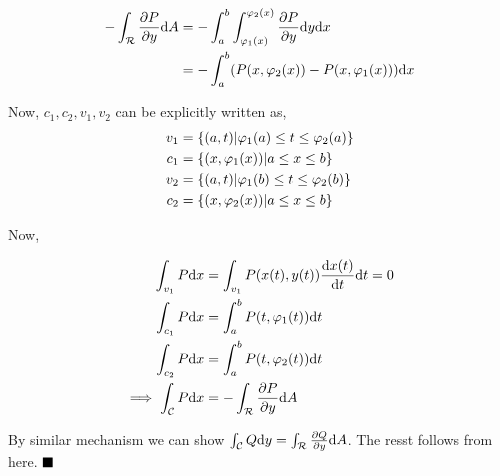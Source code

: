 \documentclass[Analysis-3]{subfiles}
\begin{document}
 \begin{align*}
    -\int_{\mathcal{R}} \pdv{P}{y} \dd A &= -\int_{a}^{b} \int_{\varphi_1(x)}^{\varphi_2(x)} \pdv{P}{y} \dd y \dd x \\
    &= - \int_{a}^{b} (P(x,\varphi_2(x))-P(x,\varphi_1(x))) \dd x \\
 \end{align*}

 Now, $c_1,c_2,v_1,v_2$ can be explicitly written as, 
 \begin{align*}
    v_1 &= \qty{(a,t) | \varphi_1(a) \le t \le \varphi_2(a)} \\
    c_1 &= \qty{(x,\varphi_1(x)) | a \le x \le b} \\
    v_2 &= \qty{(a,t) | \varphi_1(b) \le t \le \varphi_2(b)} \\
    c_2 &= \qty{(x,\varphi_2(x)) | a \le x \le b}
 \end{align*}

 Now,

 \begin{align*}
    \int_{v_1} P \dd x &= \int_{v_1} P(x(t),y(t)) \dv{x(t)}{t} \dd t = 0 \\
    \int_{c_1} P \dd x &= \int_{a}^{b} P(t,\varphi_1(t)) \dd t \\
    \int_{c_2} P \dd x &= \int_{a}^{b} P(t,\varphi_2(t)) \dd t \\
    \implies \int_{\mathcal{C}} P\dd x &= -\int_{\mathcal{R}} \pdv{P}{y} \dd A
 \end{align*}

 
 By similar mechanism we can show $\int_{\mathcal{C}} Q \dd y = \int_{\mathcal{R}} \pdv{Q}{y} \dd A$. The resst follows from here. $\hfill \blacksquare$


 
\end{document}
